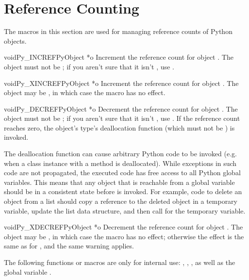 \documentclass{manual}
\begin{document}
\chapter{Reference Counting \label{countingRefs}}

The macros in this section are used for managing reference counts
of Python objects.

\begin{cfuncdesc}{void}{Py_INCREF}{PyObject *o}
Increment the reference count for object .  The object must
not be \NULL{}; if you aren't sure that it isn't \NULL{}, use
.
\end{cfuncdesc}

\begin{cfuncdesc}{void}{Py_XINCREF}{PyObject *o}
Increment the reference count for object .  The object may be
\NULL{}, in which case the macro has no effect.
\end{cfuncdesc}

\begin{cfuncdesc}{void}{Py_DECREF}{PyObject *o}
Decrement the reference count for object .  The object must
not be \NULL{}; if you aren't sure that it isn't \NULL{}, use
.  If the reference count reaches zero, the
object's type's deallocation function (which must not be \NULL{}) is
invoked.

 The deallocation function can cause arbitrary Python
code to be invoked (e.g. when a class instance with a 
method is deallocated).  While exceptions in such code are not
propagated, the executed code has free access to all Python global
variables.  This means that any object that is reachable from a global
variable should be in a consistent state before  is
invoked.  For example, code to delete an object from a list should
copy a reference to the deleted object in a temporary variable, update
the list data structure, and then call  for the
temporary variable.
\end{cfuncdesc}

\begin{cfuncdesc}{void}{Py_XDECREF}{PyObject *o}
Decrement the reference count for object .  The object may be
\NULL{}, in which case the macro has no effect; otherwise the effect
is the same as for , and the same warning
applies.
\end{cfuncdesc}

The following functions or macros are only for internal use:
, ,
, as well as the global variable
.
\end{document}
